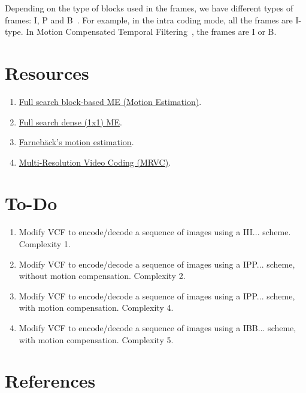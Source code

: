 Depending on the type of blocks used in the frames, we have different
types of frames: I, P and B~\cite{vruiz__MC}. For example, in the
intra coding mode, all the frames are I-type. In Motion Compensated
Temporal Filtering~\cite{vruiz__MCTF}, the frames are I or B.

\section{Resources}
\begin{enumerate}
\item \href{https://github.com/vicente-gonzalez-ruiz/motion_estimation/blob/main/src/motion_estimation/full_search_block_ME.ipynb}{Full search block-based ME (Motion Estimation)}.
\item \href{https://github.com/vicente-gonzalez-ruiz/motion_estimation/blob/main/src/motion_estimation/full_search_dense_ME.ipynb}{Full search dense (1x1) ME}.
\item \href{https://github.com/vicente-gonzalez-ruiz/motion_estimation/blob/main/src/motion_estimation/farneback_ME.ipynb}{Farnebäck's motion estimation}.
\item \href{https://github.com/Sistemas-Multimedia/MRVC}{Multi-Resolution Video Coding (MRVC)}.
\end{enumerate}

\section{To-Do}

\begin{enumerate}
\item Modify VCF to encode/decode a sequence of images using a
  III... scheme. Complexity 1.
\item Modify VCF to encode/decode a sequence of images using a
  IPP... scheme, without motion compensation. Complexity 2.
\item Modify VCF to encode/decode a sequence of images using a
  IPP... scheme, with motion compensation. Complexity 4.
\item Modify VCF to encode/decode a sequence of images using a
  IBB... scheme, with motion compensation. Complexity 5.
\end{enumerate}

  
\section{References}

\renewcommand{\addcontentsline}[3]{}%


